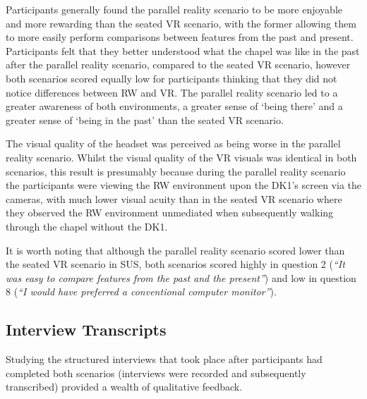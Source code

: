 Participants generally found the parallel reality scenario to be more enjoyable and more rewarding than the seated VR scenario, with the former allowing them to more easily perform comparisons between features from the past and present. Participants felt that they better understood what the chapel was like in the past after the parallel reality scenario, compared to the seated VR scenario, however both scenarios scored equally low for participants thinking that they did not notice differences between RW and VR. The parallel reality scenario led to a greater awareness of both environments, a greater sense of `being there' and a greater sense of `being in the past' than the seated VR scenario.

The visual quality of the headset was perceived as being worse in the parallel reality scenario. Whilst the visual quality of the VR visuals was identical in both scenarios, this result is presumably because during the parallel reality scenario the participants were viewing the RW environment upon the DK1's screen via the cameras, with much lower visual acuity than in the seated VR scenario where they observed the RW environment unmediated when subsequently walking through the chapel without the DK1.

It is worth noting that although the parallel reality scenario scored lower than the seated VR scenario in SUS, both scenarios scored highly in question 2 (\textit{``It was easy to compare features from the past and the present''}) and low in question 8 (\textit{``I would have preferred a conventional computer monitor''}).


\subsection{Interview Transcripts}

Studying the structured interviews that took place after participants had completed both scenarios (interviews were recorded and subsequently transcribed) provided a wealth of qualitative feedback.

